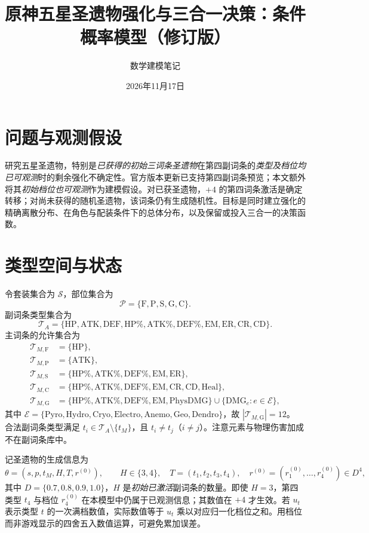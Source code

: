 \documentclass[11pt,a4paper]{ctexart}
\title{原神五星圣遗物强化与三合一决策：条件概率模型（修订版）}
\author{数学建模笔记}
\date{2026年11月17日}
\begin{document}
\maketitle
\tableofcontents
\clearpage
\section{问题与观测假设}
研究五星圣遗物，特别是\emph{已获得的初始三词条圣遗物}在第四副词条的\emph{类型及档位均已可观测}时的剩余强化不确定性。官方版本更新已支持第四副词条预览；本文额外将其\emph{初始档位也可观测}作为建模假设。对已获圣遗物，$+4$ 的第四词条激活是确定转移；对尚未获得的随机圣遗物，该词条仍有生成随机性。目标是同时建立强化的精确离散分布、在角色与配装条件下的总体分布，以及保留或投入三合一的决策函数。

\section{类型空间与状态}
令套装集合为 $\mathcal S$，部位集合为
\[
\mathcal P=\{\mathrm F,\mathrm P,\mathrm S,\mathrm G,\mathrm C\}.
\]
副词条类型集合为
\[
\mathcal T_A=\{\mathrm{HP},\mathrm{ATK},\mathrm{DEF},\mathrm{HP\%},\mathrm{ATK\%},\mathrm{DEF\%},\mathrm{EM},\mathrm{ER},\mathrm{CR},\mathrm{CD}\}.
\]
主词条的允许集合为
\begin{align*}
\mathcal T_{M,\mathrm F}&=\{\mathrm{HP}\},\\
\mathcal T_{M,\mathrm P}&=\{\mathrm{ATK}\},\\
\mathcal T_{M,\mathrm S}&=\{\mathrm{HP\%},\mathrm{ATK\%},\mathrm{DEF\%},\mathrm{EM},\mathrm{ER}\},\\
\mathcal T_{M,\mathrm C}&=\{\mathrm{HP\%},\mathrm{ATK\%},\mathrm{DEF\%},\mathrm{EM},\mathrm{CR},\mathrm{CD},\mathrm{Heal}\},\\
\mathcal T_{M,\mathrm G}&=\{\mathrm{HP\%},\mathrm{ATK\%},\mathrm{DEF\%},\mathrm{EM},\mathrm{PhysDMG}\}\cup\{\mathrm{DMG}_e:e\in\mathcal E\},
\end{align*}
其中 $\mathcal E=\{\mathrm{Pyro},\mathrm{Hydro},\mathrm{Cryo},\mathrm{Electro},\mathrm{Anemo},\mathrm{Geo},\mathrm{Dendro}\}$，故 $|\mathcal T_{M,\mathrm G}|=12$。
合法副词条类型满足 $t_i\in\mathcal T_A\setminus\{t_M\}$，且 $t_i\neq t_j$（$i\neq j$）。注意元素与物理伤害加成不在副词条库中。

记圣遗物的生成信息为
\[
\theta=(s,p,t_M,H,T,r^{(0)}),\qquad H\in\{3,4\},\quad T=(t_1,t_2,t_3,t_4),\quad r^{(0)}=(r_1^{(0)},\ldots,r_4^{(0)})\in D^4,
\]
其中 $D=\{0.7,0.8,0.9,1.0\}$，$H$ 是\emph{初始已激活}副词条的数量。即使 $H=3$，第四类型 $t_4$ 与档位 $r_4^{(0)}$ 在本模型中仍属于已观测信息；其数值在 $+4$ 才生效。若 $u_t$ 表示类型 $t$ 的一次满档数值，实际数值等于 $u_t$ 乘以对应归一化档位之和。用档位而非游戏显示的四舍五入数值运算，可避免累加误差。
\end{document}
